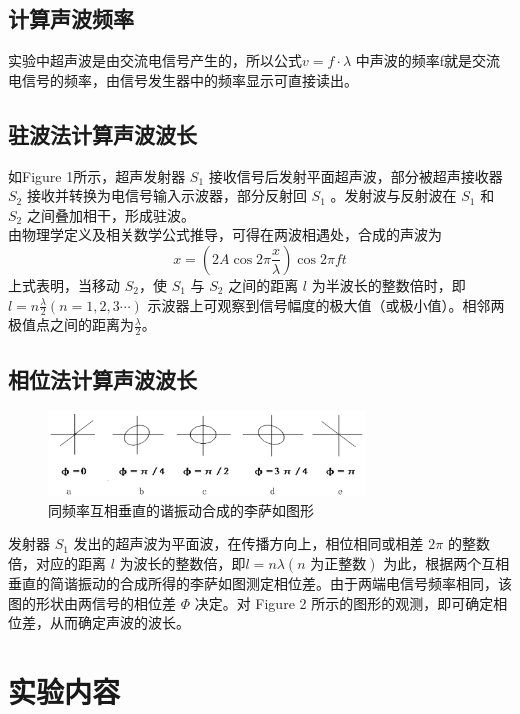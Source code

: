\documentclass[12pt,a4paper]{article}
\begin{document}
		\subsection{计算声波频率}
			实验中超声波是由交流电信号产生的，所以公式$v = f \cdot \lambda$ 中声波的频率f就是交流电信号的频率，由信号发生器中的频率显示可直接读出。
	
		\subsection{驻波法计算声波波长}
			如Figure 1所示，超声发射器 \( S_1 \) 接收信号后发射平面超声波，部分被超声接收器 \( S_2 \) 接收并转换为电信号输入示波器，部分反射回 \( S_1 \) 。发射波与反射波在 \( S_1 \) 和 \( S_2 \) 之间叠加相干，形成驻波。\\
			由物理学定义及相关数学公式推导，可得在两波相遇处，合成的声波为$$x = (2A \cos 2\pi \frac{x}{\lambda}) \cos 2\pi f t$$
			上式表明，当移动 \( S_2 \)，使 \( S_1 \) 与 \( S_2 \) 之间的距离 \( l \) 为半波长的整数倍时，即 $l = n \frac{\lambda}{2} (n = 1,2,3 \cdots)$ 示波器上可观察到信号幅度的极大值（或极小值）。相邻两极值点之间的距离为$\frac{\lambda}{2}$。
			
		\subsection{相位法计算声波波长}
			\begin{figure}[H]
			\centering
			\includegraphics[width=0.75\textwidth]{李萨如图.png} %
			\caption{同频率互相垂直的谐振动合成的李萨如图形}
			\label{fig:example}
			\end{figure}
			发射器 \(S_1\) 发出的超声波为平面波，在传播方向上，相位相同或相差 \(2\pi\) 的整数倍，对应的距离 \(l\) 为波长的整数倍，即$l = n\lambda (n \text{ 为正整数})$
			为此，根据两个互相垂直的简谐振动的合成所得的李萨如图测定相位差。由于两端电信号频率相同，该图的形状由两信号的相位差 \(\Phi\) 决定。对 Figure 2 所示的图形的观测，即可确定相位差，从而确定声波的波长。


	\section{实验内容}
\end{document}

